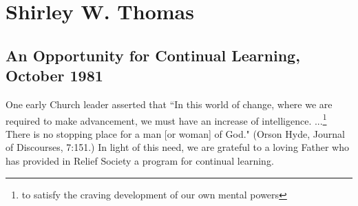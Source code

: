 \section{Shirley W. Thomas}

\subsection{An Opportunity for Continual Learning, October 1981}

One early Church leader asserted that ``In this world of change, where we are required to make advancement, we must have an increase of intelligence. ...\footnote{to satisfy the craving development of our own mental powers} There is no stopping place for a man [or woman] of God." (Orson Hyde, Journal of Discourses, 7:151.) In light of this need, we are grateful to a loving Father who has provided in Relief Society a program for continual learning.